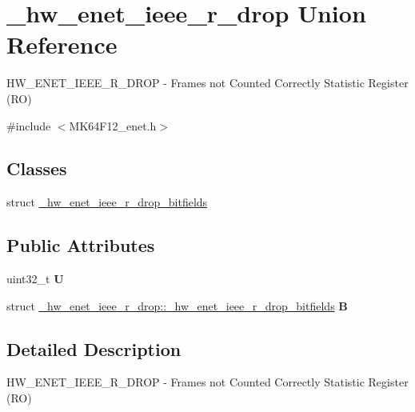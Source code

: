 \hypertarget{union__hw__enet__ieee__r__drop}{}\section{\+\_\+hw\+\_\+enet\+\_\+ieee\+\_\+r\+\_\+drop Union Reference}
\label{union__hw__enet__ieee__r__drop}


H\+W\+\_\+\+E\+N\+E\+T\+\_\+\+I\+E\+E\+E\+\_\+\+R\+\_\+\+D\+R\+OP -\/ Frames not Counted Correctly Statistic Register (RO)  




{\ttfamily \#include $<$M\+K64\+F12\+\_\+enet.\+h$>$}

\subsection*{Classes}
\begin{DoxyCompactItemize}
\item 
struct \hyperlink{struct__hw__enet__ieee__r__drop_1_1__hw__enet__ieee__r__drop__bitfields}{\+\_\+hw\+\_\+enet\+\_\+ieee\+\_\+r\+\_\+drop\+\_\+bitfields}
\end{DoxyCompactItemize}
\subsection*{Public Attributes}
\begin{DoxyCompactItemize}
\item 
uint32\+\_\+t {\bfseries U}\hypertarget{union__hw__enet__ieee__r__drop_af02985d8d340e70ef4bf543441e35d3c}{}\label{union__hw__enet__ieee__r__drop_af02985d8d340e70ef4bf543441e35d3c}

\item 
struct \hyperlink{struct__hw__enet__ieee__r__drop_1_1__hw__enet__ieee__r__drop__bitfields}{\+\_\+hw\+\_\+enet\+\_\+ieee\+\_\+r\+\_\+drop\+::\+\_\+hw\+\_\+enet\+\_\+ieee\+\_\+r\+\_\+drop\+\_\+bitfields} {\bfseries B}\hypertarget{union__hw__enet__ieee__r__drop_af79de9ea9cad3f07ee7464d8d4c7922f}{}\label{union__hw__enet__ieee__r__drop_af79de9ea9cad3f07ee7464d8d4c7922f}

\end{DoxyCompactItemize}


\subsection{Detailed Description}
H\+W\+\_\+\+E\+N\+E\+T\+\_\+\+I\+E\+E\+E\+\_\+\+R\+\_\+\+D\+R\+OP -\/ Frames not Counted Correctly Statistic Register (RO) 

